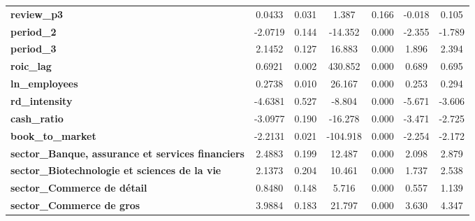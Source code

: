 \begin{center}
\begin{tabular}{lcccccc}
\textbf{review\_p3}                                                   &       0.0433  &        0.031     &     1.387  &         0.166        &       -0.018    &        0.105     \\
\textbf{period\_2}                                                    &      -2.0719  &        0.144     &   -14.352  &         0.000        &       -2.355    &       -1.789     \\
\textbf{period\_3}                                                    &       2.1452  &        0.127     &    16.883  &         0.000        &        1.896    &        2.394     \\
\textbf{roic\_lag}                                                    &       0.6921  &        0.002     &   430.852  &         0.000        &        0.689    &        0.695     \\
\textbf{ln\_employees}                                                &       0.2738  &        0.010     &    26.167  &         0.000        &        0.253    &        0.294     \\
\textbf{rd\_intensity}                                                &      -4.6381  &        0.527     &    -8.804  &         0.000        &       -5.671    &       -3.606     \\
\textbf{cash\_ratio}                                                  &      -3.0977  &        0.190     &   -16.278  &         0.000        &       -3.471    &       -2.725     \\
\textbf{book\_to\_market}                                             &      -2.2131  &        0.021     &  -104.918  &         0.000        &       -2.254    &       -2.172     \\
\textbf{sector\_Banque, assurance et services financiers}             &       2.4883  &        0.199     &    12.487  &         0.000        &        2.098    &        2.879     \\
\textbf{sector\_Biotechnologie et sciences de la vie}                 &       2.1373  &        0.204     &    10.461  &         0.000        &        1.737    &        2.538     \\
\textbf{sector\_Commerce de détail}                                   &       0.8480  &        0.148     &     5.716  &         0.000        &        0.557    &        1.139     \\
\textbf{sector\_Commerce de gros}                                     &       3.9884  &        0.183     &    21.797  &         0.000        &        3.630    &        4.347     \\

\end{tabular}
\end{center}
